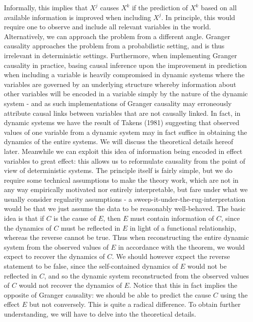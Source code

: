 \documentclass[11pt, a4paper]{memoir}
\theoremstyle{plain}
\theoremstyle{definition}
\begin{document}
Informally, this implies that $X^j$ causes $X^k$ if the prediction of $X^k$ based on all available information is improved when including $X^j$. In principle, this would require one to observe and include all relevant variables in the world.\\
Alternatively, we can approach the problem from a different angle. Granger causality approaches the problem from a probabilistic setting, and is thus irrelevant in deterministic settings. Furthermore, when implementing Granger causality in practice, basing causal inference upon the improvement in prediction when including a variable is heavily compromised in dynamic systems where the variables are governed by an underlying structure whereby information about other variables will be encoded in a variable simply by the nature of the dynamic system - and as such implementations of Granger causality may erroneously attribute causal links between variables that are not causally linked. In fact, in dynamic systems we have the result of Takens (1981) suggesting that observed values of one variable from a dynamic system may in fact suffice in obtaining the dynamics of the entire systems. We will discuss the theoretical details hereof later. Meanwhile we can exploit this idea of information being encoded in effect variables to great effect: this allows us to reformulate causality from the point of view of deterministic systems. The principle itself is fairly simple, but we do require some technical assumptions to make the theory work, which are not in any way empirically motivated nor entirely interpretable, but fare under what we usually consider regularity assumptions - a sweep-it-under-the-rug-interpretation would be that we just assume the data to be reasonably well-behaved. The basic idea is that if $C$ is the cause of $E$, then $E$ must contain information of $C$, since the dynamics of $C$ must be reflected in $E$ in light of a functional relationship, whereas the reverse cannot be true. Thus when reconstructing the entire dynamic system from the observed values of $E$ in accordance with the theorem, we would expect to recover the dynamics of $C$. We should however expect the reverse statement to be false, since the self-contained dynamics of $E$ would not be reflected in $C$, and so the dynamic system reconstructed from the observed values of $C$ would not recover the dynamics of $E$. Notice that this in fact implies the opposite of Granger causality: we should be able to predict the cause $C$ using the effect $E$ but not conversely. This is quite a radical difference. To obtain further understanding, we will have to delve into the theoretical details. 
\end{document}

